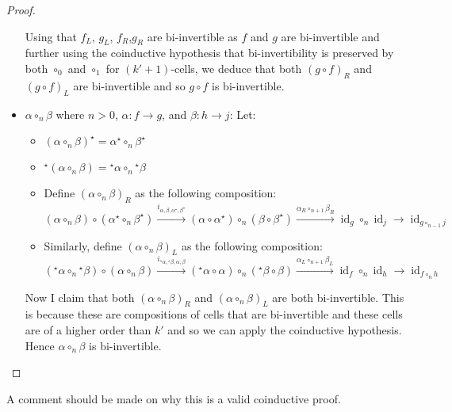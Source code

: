 \documentclass{article}
\theoremstyle{definition}
\theoremstyle{examplestyle}
\DeclareMathOperator{\id}{id}
\newcommand{\linv}[1]{{}^\star\!#1}
\newcommand{\rinv}[1]{#1^\star}
\begin{document}
\begin{proof}
\begin{itemize}
      Using that \(f_L\), \(g_L\), \(f_R\),\(g_R\) are bi-invertible as \(f\) and \(g\) are bi-invertible and further using the coinductive hypothesis that bi-invertibility is preserved by both \(\circ_0\) and \(\circ_1\) for \((k'+1)\)-cells, we deduce that both \({(g \circ f)}_R\) and \({(g \circ f)}_L\) are bi-invertible and so \(g \circ f\) is bi-invertible.
    \item \(\alpha \circ_n \beta\) where \(n > 0\), \(\alpha: f \to g\), and \(\beta: h \to j\): Let:
      \begin{itemize}
      \item \(\rinv {(\alpha \circ_n \beta)} = \rinv \alpha \circ_n \rinv \beta\)
      \item \(\linv {(\alpha \circ_n \beta)} = \linv \alpha \circ_n \linv \beta\)
      \item Define \({(\alpha \circ_n \beta)}_R\) as the following composition:
        \begin{equation*}
          (\alpha \circ_n \beta) \circ (\rinv \alpha \circ_n \rinv \beta) \overset {i_{\alpha,\beta,\rinv \alpha, \rinv \beta}} \to (\alpha \circ \rinv \alpha) \circ_n (\beta \circ \rinv \beta) \overset {\alpha _R \circ_{n+1} \beta _R} \to \id_g \circ_n \id_j \to \id_{g \circ_{n-1} j}
        \end{equation*}
      \item Similarly, define \({(\alpha \circ_n \beta)}_L\) as the following composition:
        \begin{equation*}
          (\linv \alpha \circ_n \linv \beta) \circ (\alpha \circ_n \beta) \overset {i_{\linv \alpha, \linv \beta, \alpha, \beta}} \to (\linv \alpha \circ \alpha) \circ_n (\linv \beta \circ \beta) \overset {\alpha _L \circ_{n+1} \beta _L} \to \id_f \circ_n \id_h \to \id_{f \circ_n h}
        \end{equation*}
    \end{itemize}
    Now I claim that both \({(\alpha \circ_n \beta)}_R\) and \({(\alpha \circ_n \beta)}_L\) are both bi-invertible. This is because these are compositions of cells that are bi-invertible and these cells are of a higher order than \(k'\) and so we can apply the coinductive hypothesis. Hence \(\alpha \circ_n \beta\) is bi-invertible.
  \end{itemize}
\end{proof}
A comment should be made on why this is a valid coinductive proof.
\end{document}

